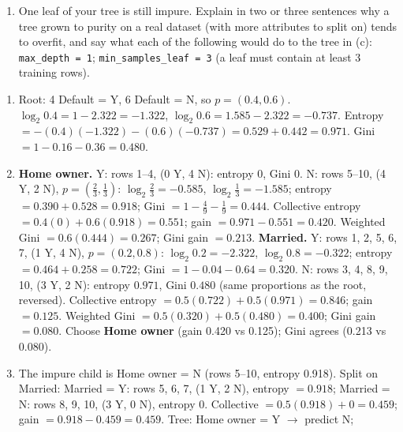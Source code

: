 \documentclass[
  11pt,
]{article}
\providecommand{\tightlist}{%
  \setlength{\itemsep}{0pt}\setlength{\parskip}{0pt}}
\newcommand{\answerspace}[1]{\par\vspace*{#1}}  %
\begin{document}
\answerspace{3in}

\begin{enumerate}
\def\labelenumi{(\alph{enumi})}
\setcounter{enumi}{3}
\tightlist
\item
  One leaf of your tree is still impure. Explain in two or three
  sentences why a tree grown to purity on a real dataset (with more
  attributes to split on) tends to overfit, and say what each of the
  following would do to the tree in (c): \texttt{max\_depth\ =\ 1};
  \texttt{min\_samples\_leaf\ =\ 3} (a leaf must contain at least 3
  training rows).
\end{enumerate}

\answerspace{2.2in}

\begin{solutionbox}

\begin{enumerate}
\def\labelenumi{(\alph{enumi})}
\item
  Root: 4 Default = Y, 6 Default = N, so \(p = (0.4, 0.6)\).
  \(\log_2 0.4 = 1 - 2.322 = -1.322\),
  \(\log_2 0.6 = 1.585 - 2.322 = -0.737\). Entropy
  \(= -(0.4)(-1.322) - (0.6)(-0.737) = 0.529 + 0.442 = 0.971\). Gini
  \(= 1 - 0.16 - 0.36 = 0.480\).
\item
  \textbf{Home owner.} Y: rows 1--4, (0 Y, 4 N): entropy 0, Gini 0. N:
  rows 5--10, (4 Y, 2 N), \(p = (\tfrac23, \tfrac13)\):
  \(\log_2\tfrac23 = -0.585\), \(\log_2\tfrac13 = -1.585\); entropy
  \(= 0.390 + 0.528 = 0.918\); Gini
  \(= 1 - \tfrac49 - \tfrac19 = 0.444\). Collective entropy
  \(= 0.4(0) + 0.6(0.918) = 0.551\); gain \(= 0.971 - 0.551 = 0.420\).
  Weighted Gini \(= 0.6(0.444) = 0.267\); Gini gain \(= 0.213\).
  \textbf{Married.} Y: rows 1, 2, 5, 6, 7, (1 Y, 4 N),
  \(p = (0.2, 0.8)\): \(\log_2 0.2 = -2.322\), \(\log_2 0.8 = -0.322\);
  entropy \(= 0.464 + 0.258 = 0.722\); Gini
  \(= 1 - 0.04 - 0.64 = 0.320\). N: rows 3, 4, 8, 9, 10, (3 Y, 2 N):
  entropy \(0.971\), Gini \(0.480\) (same proportions as the root,
  reversed). Collective entropy \(= 0.5(0.722) + 0.5(0.971) = 0.846\);
  gain \(= 0.125\). Weighted Gini \(= 0.5(0.320) + 0.5(0.480) = 0.400\);
  Gini gain \(= 0.080\). Choose \textbf{Home owner} (gain 0.420 vs
  0.125); Gini agrees (0.213 vs 0.080).
\item
  The impure child is Home owner = N (rows 5--10, entropy 0.918). Split
  on Married: Married = Y: rows 5, 6, 7, (1 Y, 2 N), entropy
  \(= 0.918\); Married = N: rows 8, 9, 10, (3 Y, 0 N), entropy 0.
  Collective \(= 0.5(0.918) + 0 = 0.459\); gain
  \(= 0.918 - 0.459 = 0.459\). Tree: Home owner = Y \(\to\) predict N;

\end{enumerate}
\end{solutionbox}
\end{document}
